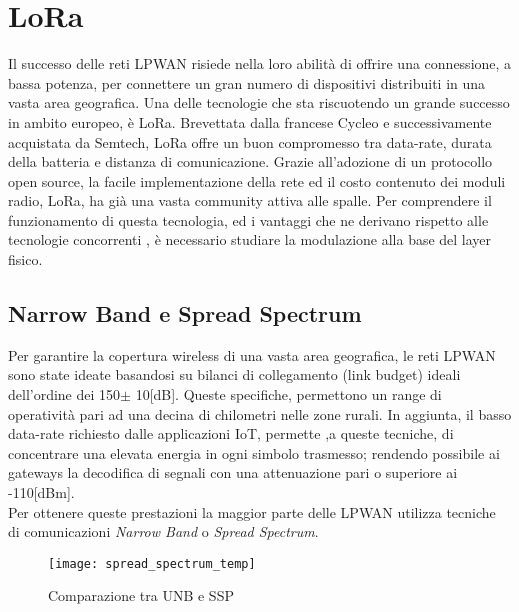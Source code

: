 \chapter{LoRa}
Il successo delle reti LPWAN risiede nella loro abilità di offrire una
connessione, a bassa potenza, per connettere un gran numero di  dispositivi distribuiti in una
vasta area geografica. 
Una delle  tecnologie che sta riscuotendo un grande successo in 
ambito europeo, è LoRa.
Brevettata dalla francese Cycleo e successivamente acquistata da Semtech, LoRa 
 offre un buon compromesso tra data-rate,
durata della batteria e distanza di comunicazione.
Grazie all'adozione di un protocollo open source, la facile implementazione della rete
ed il costo contenuto dei moduli radio, LoRa, ha già una vasta community attiva alle
spalle. Per comprendere il funzionamento di questa tecnologia, ed i vantaggi che ne
derivano rispetto alle tecnologie concorrenti , è necessario
studiare la modulazione alla base del layer fisico.

\section{Narrow Band e Spread Spectrum}
Per garantire la copertura wireless di una vasta area geografica, le reti LPWAN 
sono state ideate basandosi su  bilanci di
collegamento (link budget) ideali  dell'ordine dei 150$\pm$ 10[dB]. 
Queste specifiche, permettono  un range di operatività
pari ad una decina di chilometri nelle zone rurali. 
In aggiunta, il basso data-rate richiesto dalle applicazioni IoT, permette ,a
queste tecniche, di concentrare una elevata energia in
ogni simbolo trasmesso; rendendo possibile ai gateways la decodifica di 
segnali con una attenuazione pari o superiore ai -110[dBm].\\
Per ottenere queste
prestazioni la maggior parte delle LPWAN  utilizza tecniche di comunicazioni
\emph{Narrow Band} o \emph{Spread Spectrum}.

\begin{figure}[ht]
\centering 
\texttt{[image: spread\_spectrum\_temp]}
\caption{Comparazione tra UNB e SSP}
\end{figure}


